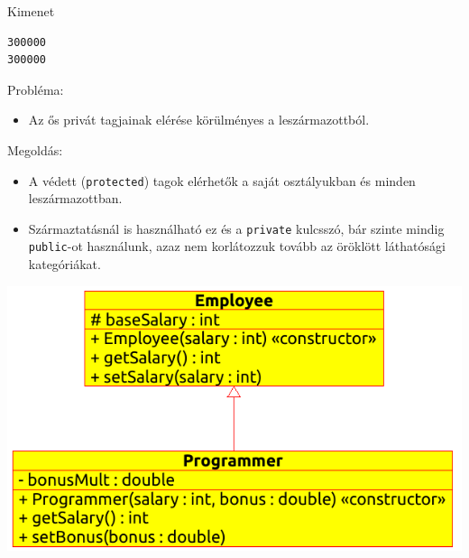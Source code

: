 \begin{frame}[fragile]
    \begin{exampleblock}{}
        \footnotesize
        
    \end{exampleblock}
    \begin{block}{Kimenet}
        \footnotesize
        \vspace{-.3cm}
        \begin{verbatim}
300000
300000
        \end{verbatim}
        \vspace{-.6cm}
    \end{block}
\end{frame}

\begin{frame}
    Probléma:
    \begin{itemize}
        \item Az ős privát tagjainak elérése körülményes a leszármazottból.
    \end{itemize}
    Megoldás:
    \begin{itemize}
        \item A védett (\texttt{protected}) tagok elérhetők a saját osztályukban és minden leszármazottban.
        \item Származtatásnál is használható ez és a \texttt{private} kulcsszó, bár szinte mindig \texttt{public}-ot használunk, azaz nem korlátozzuk tovább az öröklött láthatósági kategóriákat.
    \end{itemize}
\end{frame}

\begin{frame}
    \begin{center}
        \includegraphics[scale=0.75]{inheritance03.eps}
      \end{center}
\end{frame}

